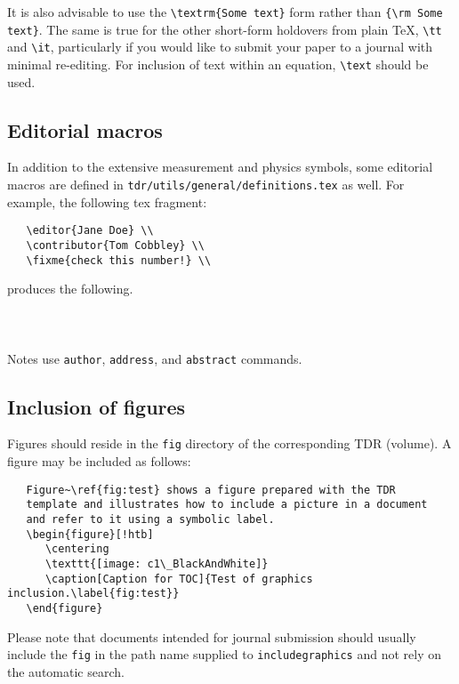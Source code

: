 It is also advisable to use the \verb|\textrm{Some text}| form rather than
\verb|{\rm Some text}|. The same is true for the other short-form holdovers from plain \TeX,
\verb|\tt| and \verb|\it|, particularly if you would like to submit your paper to a journal
with minimal re-editing. For inclusion of text within an equation, \verb|\text| should be used.

\subsection{Editorial macros}


In addition to the extensive measurement and physics symbols,
some editorial macros are defined in
\texttt{tdr/utils/general/definitions.tex} as well.
For example, the following tex fragment:
\begin{verbatim}
   \editor{Jane Doe} \\
   \contributor{Tom Cobbley} \\
   \fixme{check this number!} \\
\end{verbatim}
%
produces the following. \\
\bigbreak
{}\mbox{~}\\
\mbox{~} \\
\mbox{~}\\

Notes use \texttt{author}, \texttt{address}, and \texttt{abstract} commands.



\subsection{Inclusion of figures}

Figures should reside in the \texttt{fig} directory of the corresponding TDR (volume).
A figure may be included as follows:
%
\begin{verbatim}
   Figure~\ref{fig:test} shows a figure prepared with the TDR
   template and illustrates how to include a picture in a document
   and refer to it using a symbolic label.
   \begin{figure}[!htb]
      \centering
      \texttt{[image: c1\_BlackAndWhite]}
      \caption[Caption for TOC]{Test of graphics inclusion.\label{fig:test}}
   \end{figure}
\end{verbatim}
%
Please note that documents intended for journal submission should usually include the \texttt{fig} in the path name supplied to \texttt{includegraphics} and not rely on the automatic search.

